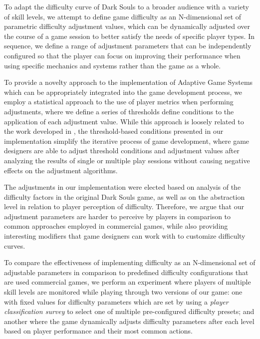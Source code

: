 To adapt the difficulty curve of Dark Souls to a broader audience with a variety of skill levels, we attempt to define game difficulty as an N-dimensional set of parametric difficulty adjustment values, which can be dynamically adjusted over the course of a game session to better satisfy the needs of specific player types. In sequence, we define a range of adjustment parameters that can be independently configured so that the player can focus on improving their performance when using specific mechanics and systems rather than the game as a whole.

To provide a novelty approach to the implementation of Adaptive Game Systems which can be appropriately integrated into the game development process, we employ a statistical approach to the use of player metrics when performing adjustments, where we define a series of thresholds define conditions to the application of each adjustment value. While this approach is loosely related to the work developed in \cite{article_casefordda}, the threshold-based conditions presented in our implementation simplify the iterative process of game development, where game designers are able to adjust threshold conditions and adjustment values after analyzing the results of single or multiple play sessions without causing negative effects on the adjustment algorithms.

The adjustments in our implementation were elected based on analysis of the difficulty factors in the original Dark Souls game, as well as on the abstraction level in relation to player perception of difficulty. Therefore, we argue that our adjustment parameters are harder to perceive by players in comparison to common approaches employed in commercial games, while also providing interesting modifiers that game designers can work with to customize difficulty curves.

To compare the effectiveness of implementing difficulty as an N-dimensional set of adjustable parameters in comparison to predefined difficulty configurations that are used commercial games, we perform an experiment where players of multiple skill levels are monitored while playing through two versions of our game: one with fixed values for difficulty parameters which are set by using a \emph{player classification survey} to select one of multiple pre-configured difficulty presets; and another where the game dynamically adjusts difficulty parameters after each level based on player performance and their most common actions.

